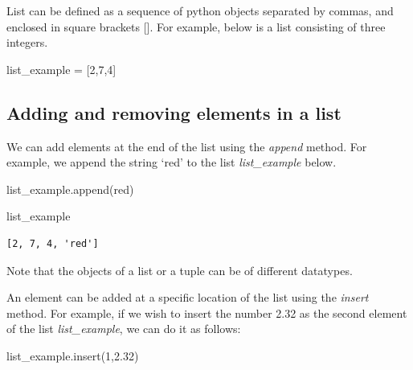 \documentclass[
  letterpaper,
  DIV=11,
  numbers=noendperiod]{scrreprt}
\newenvironment{Shaded}{\begin{snugshade}}{\end{snugshade}}
\newcommand{\DecValTok}[1]{\textcolor[rgb]{0.68,0.00,0.00}{#1}}
\newcommand{\FloatTok}[1]{\textcolor[rgb]{0.68,0.00,0.00}{#1}}
\newcommand{\NormalTok}[1]{\textcolor[rgb]{0.00,0.23,0.31}{#1}}
\newcommand{\OperatorTok}[1]{\textcolor[rgb]{0.37,0.37,0.37}{#1}}
\newcommand{\StringTok}[1]{\textcolor[rgb]{0.13,0.47,0.30}{#1}}
\begin{document}
List can be defined as a sequence of python objects separated by commas,
and enclosed in square brackets {[}{]}. For example, below is a list
consisting of three integers.

\begin{Shaded}
\begin{Highlighting}[]
\NormalTok{list\_example }\OperatorTok{=}\NormalTok{ [}\DecValTok{2}\NormalTok{,}\DecValTok{7}\NormalTok{,}\DecValTok{4}\NormalTok{]}
\end{Highlighting}
\end{Shaded}

\hypertarget{adding-and-removing-elements-in-a-list}{%
\subsection{Adding and removing elements in a
list}\label{adding-and-removing-elements-in-a-list}}

We can add elements at the end of the list using the \emph{append}
method. For example, we append the string `red' to the list
\emph{list\_example} below.

\begin{Shaded}
\begin{Highlighting}[]
\NormalTok{list\_example.append(}\StringTok{\textquotesingle{}red\textquotesingle{}}\NormalTok{)}
\end{Highlighting}
\end{Shaded}

\begin{Shaded}
\begin{Highlighting}[]
\NormalTok{list\_example}
\end{Highlighting}
\end{Shaded}

\begin{verbatim}
[2, 7, 4, 'red']
\end{verbatim}

Note that the objects of a list or a tuple can be of different
datatypes.

An element can be added at a specific location of the list using the
\emph{insert} method. For example, if we wish to insert the number 2.32
as the second element of the list \emph{list\_example}, we can do it as
follows:

\begin{Shaded}
\begin{Highlighting}[]
\NormalTok{list\_example.insert(}\DecValTok{1}\NormalTok{,}\FloatTok{2.32}\NormalTok{)}
\end{Highlighting}
\end{Shaded}
\end{document}

